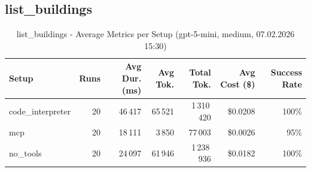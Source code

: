 \documentclass[a4paper,11pt]{article}
\begin{document}
\subsection{list\_buildings}

\begin{table}[H]
\centering
\scriptsize
\caption{list\_buildings - Average Metrics per Setup (gpt-5-mini, medium, 07.02.2026 15:30)}
\label{tab:combined\_list\_buildings\_metrics\_20260207}
\begin{tabular}{l r r r r r r}
\toprule
Setup & Runs & Avg Dur. (ms) & Avg Tok. & Total Tok. & Avg Cost (\$) & Success Rate \\
\midrule
code\_interpreter & 20 & 46\,417 & 65\,521 & 1\,310\,420 & \$0.0208 & 100\% \\
mcp & 20 & 18\,111 & 3\,850 & 77\,003 & \$0.0026 & 95\% \\
no\_tools & 20 & 24\,097 & 61\,946 & 1\,238\,936 & \$0.0182 & 100\% \\
\bottomrule
\end{tabular}
\end{table}
\end{document}
